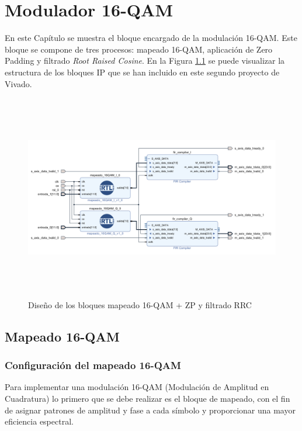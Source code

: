 \chapter{Modulador 16-QAM}
\label{section:qam}


En este Capítulo se muestra el bloque encargado de la modulación 16-QAM. Este bloque se compone de tres procesos: mapeado 16-QAM, aplicación de Zero Padding y filtrado \textit{Root Raised Cosine}. En la Figura \ref{fig:qam_fir} se puede visualizar la estructura de los bloques IP que se han incluido en este segundo proyecto de Vivado. 

\vspace{1mm}

\begin{figure}[h]
	\centering
	\includegraphics[width=1\textwidth,height=9cm]{img/diseno/qam_fir.PNG}
	\caption{Diseño de los bloques mapeado 16-QAM + ZP y filtrado RRC}
	\label{fig:qam_fir}
\end{figure}
    
\vspace{1mm}

\section{Mapeado 16-QAM}

\subsection{Configuración del mapeado 16-QAM}

Para implementar una modulación 16-QAM (Modulación de Amplitud en Cuadratura) lo primero que se debe realizar es el bloque de mapeado, con el fin de asignar patrones de amplitud y fase a cada símbolo y proporcionar una mayor eficiencia espectral. 


